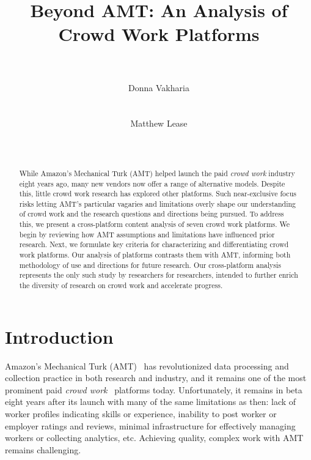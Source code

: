 \documentclass{sigchi}
\begin{document}
\title{Beyond AMT: An Analysis of Crowd Work Platforms\\~}


\author{
  \alignauthor Donna Vakharia\\
    \\
    \\
  \alignauthor Matthew Lease\\
    \\
    \\
\vspace{10pt}
}


\maketitle

\begin{abstract}
While Amazon's Mechanical Turk (AMT) helped launch the paid {\em crowd work} industry eight years ago, 
many new vendors now offer a range of alternative models. 
Despite this, little crowd work research has explored other platforms. Such near-exclusive focus risks letting AMT's particular vagaries and limitations overly shape our understanding of crowd work and the research questions and directions being pursued. 
To address this, we present a cross-platform content analysis of seven crowd work platforms. We begin by reviewing how AMT assumptions and limitations have influenced prior research. Next, we formulate key criteria for characterizing and differentiating crowd work platforms. Our analysis of platforms contrasts them with AMT, informing both methodology of use and directions for future research. Our cross-platform analysis represents the only such study by researchers for researchers, intended to  
further enrich the diversity of research on crowd work and accelerate progress.
\end{abstract}






\section{Introduction}


Amazon's Mechanical Turk (AMT)~\cite{barr2006ai,Mieszkowski06,chen2011opportunities} has revolutionized data processing and collection practice in both research and industry, and it remains one of the most prominent paid {\em crowd work}~\cite{Kittur13} platforms today. Unfortunately, it remains in beta eight years after its launch 
with many of the same limitations as then:
lack of worker profiles indicating skills or experience, inability to post worker or employer ratings and reviews, minimal infrastructure for effectively managing workers or collecting analytics, etc. 
Achieving quality, complex work with AMT remains challenging.
\end{document}
